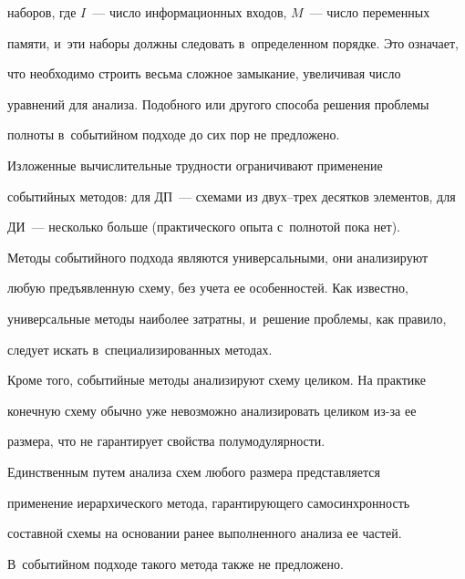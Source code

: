 наборов, где $I$~--- число информационных входов, $M$~--- число переменных 


памяти, и~эти наборы должны следовать в~определенном порядке. Это означает, 


что необходимо строить весьма сложное замыкание, увеличивая число 


уравнений для анализа. Подобного или другого способа решения проблемы 


полноты в~событийном подходе до сих пор не предложено.


   


   Изложенные вычислительные трудности ограничивают применение 


событийных методов: для ДП~--- схемами из двух--трех десятков элементов, для 


ДИ~--- несколько больше (практического опыта с~полнотой пока нет).


   


   Методы событийного подхода являются универсальными, они анализируют 


любую предъявленную схему, без учета ее особенностей. Как известно, 


универсальные методы наиболее затратны, и~решение проблемы, как правило, 


следует искать в~специализированных методах.


   


   Кроме того, событийные методы анализируют схему целиком. На практике 


конечную схему обычно уже невозможно анализировать целиком из-за ее 


размера, что не гарантирует свойства полумодулярности.


   


   Единственным путем анализа схем любого размера представляется 


применение иерархического метода, гарантирующего самосинхронность 


составной схемы на основании ранее выполненного анализа ее частей. 


В~событийном подходе такого метода также не предложено.





\vspace*{-4pt}





